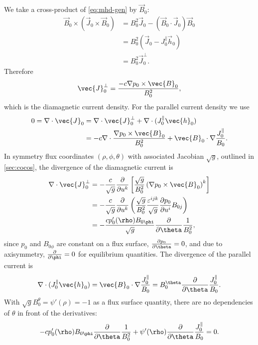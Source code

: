 We take a cross-product of \cref{eq:mhd-gen} by $\vec{B}_{0}$:
\begin{align}
  \vec{B}_{0} \times \left( \vec{J}_{0} \times \vec{B}_{0} \right) &= B_{0}^{2} \vec{J}_{0} - (\vec{B}_{0} \cdot \vec{J}_{0}) \vec{B}_{0} \nonumber \\
  &= B_{0}^{2} (\vec{J}_{0} - J_{0}^{\parallel} \vec{h}_{0}) \nonumber \\
  &= B_{0}^{2} \vec{J}_{0}^{\perp}.
\end{align}
Therefore
\begin{gather}
  \vec{J}_{0}^{\perp} = \frac{-c \grad p_{0} \times \vec{B}_{0}}{B_{0}^{2}},
\end{gather}
which is the diamagnetic current density. For the parallel current density we use
\begin{align}
 0 = \divg \vec{J}_{0} &= \divg \vec{J}_{0}^{\perp} + \divg (J_{0}^{\parallel} \vec{h}_{0}) \nonumber \\
 &= -c \divg \frac{\grad p_{0} \times \vec{B}_{0}}{B_{0}^{2}} + \vec{B}_{0} \cdot \grad \frac{J_{0}^{\parallel}}{B_{0}}.
\end{align}
In symmetry flux coordinates $(\rho, \phi, \theta)$ with associated Jacobian $\sqrt{g}$, outlined in \cref{sec:cocos}, the divergence of the diamagnetic current is
\begin{align}
  \divg \vec{J}_{0}^{\perp} &= -\frac{c}{\sqrt{g}} \pd{u^{k}} \left[ \frac{\sqrt{g}}{B_{0}^{2}} \left( \grad p_{0} \times \vec{B}_{0} \right)^{k} \right] \nonumber \\
  &= -\frac{c}{\sqrt{g}} \pd{u^{k}} \left( \frac{\sqrt{g}}{B_{0}^{2}} \frac{\varepsilon^{ijk}}{\sqrt{g}} \pd[p_{0}]{u^{i}} B_{0 j} \right) \nonumber \\
  &= -\frac{c p_{0}' (\rho) B_{0 \phi}}{\sqrt{g}} \pd{\theta} \frac{1}{B_{0}^{2}},
\end{align}
since $p_{0}$ and $B_{0 \phi}$ are constant on a flux surface, $\pd[p_{0}]{\theta} = 0$, and due to axisymmetry, $\pd{\phi} = 0$ for equilibrium quantities. The divergence of the parallel current is
\begin{gather}
  \divg(J_{0}^{\parallel} \vec{h}_{0}) = \vec{B}_{0} \cdot \grad \frac{J_{0}^{\parallel}}{B_{0}} = B_{0}^{\theta} \pd{\theta} \frac{J_{0}^{\parallel}}{B_{0}}.
\end{gather}
With $\sqrt{g} B_{0}^{\theta} = \psi'(\rho) = -1$ as a flux surface quantity, there are no dependencies of $\theta$ in front of the derivatives:
\begin{gather}
  -c p_{0}' (\rho) B_{0 \phi} \pd{\theta} \frac{1}{B_{0}^{2}} + \psi'(\rho) \pd{\theta} \frac{J_{0}^{\parallel}}{B_{0}} = 0.
\end{gather}
